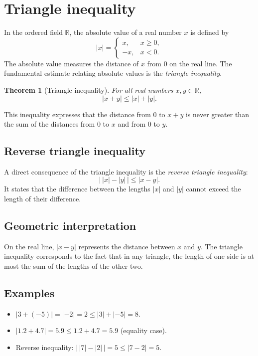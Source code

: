 \documentclass[11pt,a4paper]{article}
\theoremstyle{definition} \newtheorem{definition}{Definition} \theoremstyle{plain} \newtheorem{theorem}{Theorem}
\begin{document}
\section{Triangle inequality}\label{sec:triangle}
In the ordered field $\mathbb{R}$, the absolute value of a real number $x$ is defined by
\[ |x| = \begin{cases} x, & x\ge 0,\\ -x, & x<0. \end{cases} \]
The absolute value measures the distance of $x$ from $0$ on the real line.
The fundamental estimate relating absolute values is the \emph{triangle inequality}.
\begin{theorem}[Triangle inequality]\label{thm:triangle-inequality} For all real numbers $x,y\in\mathbb{R}$,
\[\boxed{ |x+y| \le |x| + |y|. }\]
\end{theorem}
This inequality expresses that the distance from $0$ to $x+y$ is never greater than the sum of the distances from $0$ to $x$ and from $0$ to $y$.
\subsection{Reverse triangle inequality}
A direct consequence of the triangle inequality is the \emph{reverse triangle inequality}:
\[\boxed{ \bigl|\,|x| - |y|\,\bigr| \le |x-y|. }\]
It states that the difference between the lengths $|x|$ and $|y|$ cannot exceed the length of their difference.
\subsection{Geometric interpretation}
On the real line, $|x-y|$ represents the distance between $x$ and $y$.
The triangle inequality corresponds to the fact that in any triangle, the length of one side is at most the sum of the lengths of the other two.
\subsection*{Examples}
\begin{itemize}
\item $|3 + (-5)| = | -2 | = 2 \le |3| + | -5 | = 8$.
\item $|1.2 + 4.7| = 5.9 \le 1.2 + 4.7 = 5.9$ (equality case).
\item Reverse inequality: $\bigl|\,|7| - |2|\,\bigr| = 5 \le |7-2| = 5$. \end{itemize}
\clearpage
\end{document}
